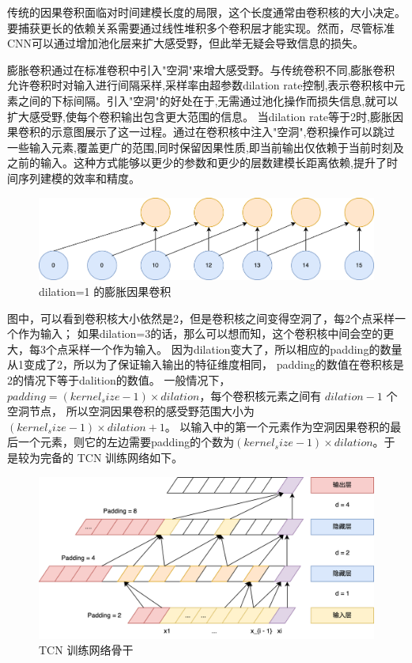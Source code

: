 传统的因果卷积面临对时间建模长度的局限，这个长度通常由卷积核的大小决定。要捕获更长的依赖关系需要通过线性堆积多个卷积层才能实现。然而，尽管标准CNN可以通过增加池化层来扩大感受野，但此举无疑会导致信息的损失。

膨胀卷积通过在标准卷积中引入"空洞"来增大感受野。与传统卷积不同,膨胀卷积允许卷积时对输入进行间隔采样,采样率由超参数dilation rate控制,表示卷积核中元素之间的下标间隔。引入"空洞"的好处在于,无需通过池化操作而损失信息,就可以扩大感受野,使每个卷积输出包含更大范围的信息。
当dilation rate等于2时,膨胀因果卷积的示意图展示了这一过程。通过在卷积核中注入"空洞",卷积操作可以跳过一些输入元素,覆盖更广的范围,同时保留因果性质,即当前输出仅依赖于当前时刻及之前的输入。这种方式能够以更少的参数和更少的层数建模长距离依赖,提升了时间序列建模的效率和精度。

\begin{figure}[htbp]
  \centering
  \includegraphics[width=\textwidth]{figures/dilation_convolution.png}
  \caption{dilation=1 的膨胀因果卷积}
\end{figure}

图中，可以看到卷积核大小依然是2，但是卷积核之间变得空洞了，每2个点采样一个作为输入；
如果dilation=3的话，那么可以想而知，这个卷积核中间会空的更大，每3个点采样一个作为输入。
因为dilation变大了，所以相应的padding的数量从1变成了2，所以为了保证输入输出的特征维度相同，
padding的数值在卷积核是2的情况下等于dalition的数值。
一般情况下，$padding=(kernel_size-1)\times dilation$，每个卷积核元素之间有 $dilation - 1$ 个空洞节点，
所以空洞因果卷积的感受野范围大小为 $(kernel_size-1) \times dilation + 1$。
以输入中的第一个元素作为空洞因果卷积的最后一个元素，则它的左边需要padding的个数为$(kernel_size-1) \times dilation$。于是较为完备的 TCN 训练网络如下。

\begin{figure}[htbp]
  \centering
  \includegraphics[width=\textwidth]{figures/tcn_1.png}
  \caption{TCN 训练网络骨干}
\end{figure}

